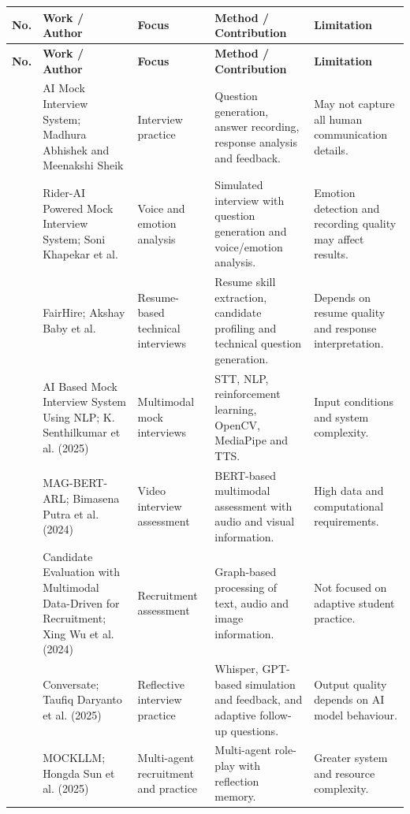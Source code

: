 \documentclass[12pt,a4paper,oneside]{report}
\begin{document}
\begingroup
\small
\sloppy
\setlength{\tabcolsep}{4pt}
\renewcommand{\arraystretch}{1.35}
\begin{longtable}{|>{\centering\arraybackslash}p{0.8cm}|>{\raggedright\arraybackslash}p{3.0cm}|>{\raggedright\arraybackslash}p{2.2cm}|>{\raggedright\arraybackslash}p{4.0cm}|>{\raggedright\arraybackslash}p{3.6cm}|}
\hline
\textbf{No.} & \textbf{Work / Author} & \textbf{Focus} & \textbf{Method / Contribution} & \textbf{Limitation} \\
\hline
\endfirsthead
\hline
\textbf{No.} & \textbf{Work / Author} & \textbf{Focus} & \textbf{Method / Contribution} & \textbf{Limitation} \\
\hline
\endhead
1 & AI Mock Interview System; Madhura Abhishek and Meenakshi Sheik & Interview practice & Question generation, answer recording, response analysis and feedback. & May not capture all human communication details. \\
\hline
2 & Rider-AI Powered Mock Interview System; Soni Khapekar et al. & Voice and emotion analysis & Simulated interview with question generation and voice/emotion analysis. & Emotion detection and recording quality may affect results. \\
\hline
3 & FairHire; Akshay Baby et al. & Resume-based technical interviews & Resume skill extraction, candidate profiling and technical question generation. & Depends on resume quality and response interpretation. \\
\hline
4 & AI Based Mock Interview System Using NLP; K. Senthilkumar et al. (2025) & Multimodal mock interviews & STT, NLP, reinforcement learning, OpenCV, MediaPipe and TTS. & Input conditions and system complexity. \\
\hline
5 & MAG-BERT-ARL; Bimasena Putra et al. (2024) & Video interview assessment & BERT-based multimodal assessment with audio and visual information. & High data and computational requirements. \\
\hline
6 & Candidate Evaluation with Multimodal Data-Driven for Recruitment; Xing Wu et al. (2024) & Recruitment assessment & Graph-based processing of text, audio and image information. & Not focused on adaptive student practice. \\
\hline
7 & Conversate; Taufiq Daryanto et al. (2025) & Reflective interview practice & Whisper, GPT-based simulation and feedback, and adaptive follow-up questions. & Output quality depends on AI model behaviour. \\
\hline
8 & MOCKLLM; Hongda Sun et al. (2025) & Multi-agent recruitment and practice & Multi-agent role-play with reflection memory. & Greater system and resource complexity. \\

\end{longtable}
\end{document}
